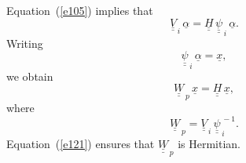 \documentclass[12pt,prb,aps,notitlepage]{revtex4-1}
\begin{document}
Equation~(\ref{e105}) implies that 
\begin{equation}
\underline{\underline{V}}_{\,i}\,\underline{\alpha}=\underline{\underline{H}}\,\underline{\underline{\psi}}_{\,i}\,\underline{\alpha}.
\end{equation}
Writing
\begin{equation}
\underline{\underline{\psi}}_{\,i}\,\underline{\alpha} = \underline{x},
\end{equation}
we obtain
\begin{equation}
\underline{\underline{W}}_{\,p}\,\underline{x}
= \underline{\underline{H}}\,\underline{x},
\end{equation}
where
\begin{equation}\label{e128}
\underline{\underline{W}}_{\,p} = \underline{\underline{V}}_{\,i}\,\underline{\underline{\psi}}_{\,i}^{\,-1}.
\end{equation}
Equation~(\ref{e121}) ensures that $\underline{\underline{W}}_{\,p}$ is Hermitian. 
\end{document}
